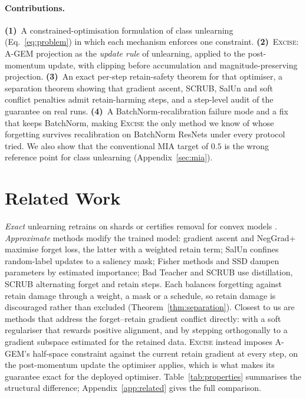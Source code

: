 \documentclass{article}
\newcommand{\ours}{\textsc{Excise}}
\newcommand{\added}[1]{{\color{revised}#1}}
\theoremstyle{remark}
\theoremstyle{plain}
\begin{document}
\paragraph{Contributions.}
\textbf{(1)}~A constrained-optimisation formulation of class unlearning
(Eq.~\ref{eq:problem}) in which each mechanism enforces one constraint.
\textbf{(2)}~\ours{}: A-GEM projection as the \emph{update rule} of unlearning,
applied to the post-momentum update, with clipping before accumulation and
magnitude-preserving projection. \textbf{(3)}~An exact per-step retain-safety
theorem for that optimiser, a separation theorem showing that gradient ascent,
SCRUB, SalUn and soft conflict penalties admit retain-harming steps, and a
step-level audit of the guarantee on real runs. \textbf{(4)}~\added{A
BatchNorm-recalibration failure mode and a fix that keeps BatchNorm, making
\ours{} the only method we know of whose forgetting survives recalibration on
BatchNorm ResNets under every protocol tried.} We also show that the
conventional MIA target of $0.5$ is the wrong reference point for class
unlearning (Appendix~\ref{sec:mia}).

\section{Related Work}\label{sec:related}

\emph{Exact} unlearning retrains on shards \citep{bourtoule2021sisa} or certifies
removal for convex models \citep{guo2020certified}. \emph{Approximate} methods
modify the trained model: gradient ascent and NegGrad+ \citep{thudi2022unrolling}
maximise forget loss, the latter with a weighted retain term; SalUn
\citep{fan2024salun} confines random-label updates to a saliency mask; Fisher
methods and SSD \citep{golatkar2020eternal,foster2024ssd} dampen parameters by
estimated importance; Bad Teacher \citep{chundawat2023badteacher} and SCRUB
\citep{kurmanji2023unbounded} use distillation, SCRUB alternating forget and
retain steps. Each balances forgetting against retain damage through a weight, a
mask or a schedule, so retain damage is discouraged rather than excluded
(Theorem~\ref{thm:separation}). Closest to us are methods that address the
forget--retain gradient conflict directly: \citet{patel2025learning} with a soft
regulariser that rewards positive alignment, and \added{\citet{hoang2024learn}
by stepping orthogonally to a gradient subspace estimated for the retained
data}. \ours{} instead imposes A-GEM's half-space constraint
\citep{chaudhry2019agem} against the current retain gradient at every step, on
the post-momentum update the optimiser applies, which is what makes its guarantee
exact for the deployed optimiser. Table~\ref{tab:properties} summarises the structural
difference; Appendix~\ref{app:related} gives the full comparison.
\end{document}
